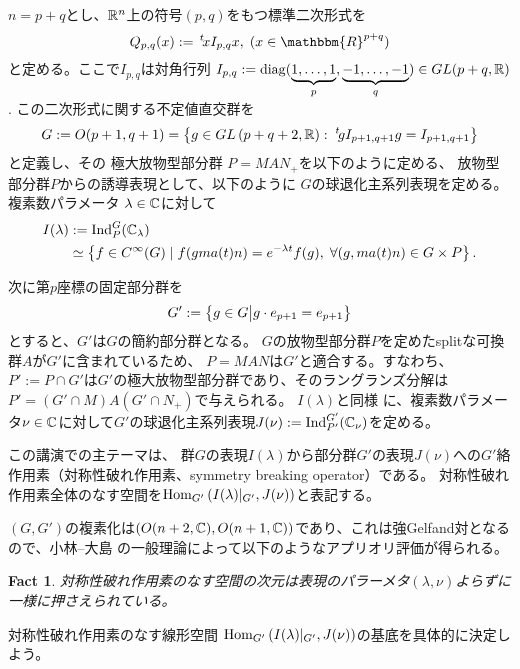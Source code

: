 \documentclass[12pt]{article} %
\newcommand{\assign}{:=}
\newcommand{\tmop}[1]{\ensuremath{\operatorname{#1}}}
\newcommand{\Hom}{\mbox{\normalfont Hom}}
\newcommand{\Ind}{\mbox{\normalfont Ind}}
\newtheorem{fact}[theorem]{Fact}
\theoremstyle{definition}
\theoremstyle{exampstyle} \newtheorem{examp}[theorem]{Theorem}
\renewcommand{\Q}{Q_{p,q}}
\newcommand{\IlambdaGprime}{I(\lambda)\kern-0.3em\mid_{G'}}
\newcommand{\SBO}{\Hom_{G'}\left(\IlambdaGprime,J(\nu) \right)}
\begin{document}
  \begin{versiona}
	  $n=p+q$と{し}、$\mathbb{R}^n$上の符号$(p,q)$をもつ標準二次形式を
	  \begin{equation*}
  \Q (x) \assign \,^t \! x I_{p, q} x, \; (x \in
  \mathbbm{R}^{p + q})
	  \end{equation*}
	  と定める。ここで$I_{p,q}$は対角行列
   $I_{p, q} \assign \tmop{diag} (\underbrace{1, \ldots, 1}_p, \underbrace{-
  1, \ldots, - 1}_q)\in GL(p+q,\R)$.
この二次形式に{関する}不定値直交群を
\begin{equation*}
	G \assign O (p +
1, q + 1)=\left\{ g\in GL\left( p+q+2,\R \right):\;^t\!gI_{p+1,q+1}g=I_{p+1,q+1} \right\}
\end{equation*}
と定義し、その
極大放物型部分群
$P=MAN_{+}$を以下のように定める、
放物型部分群$P$からの誘導表現として、以下のように
$G$の球退化主系列表現を定める。
複素数パラメータ
$\lambda\in\mathbb{C}$に対して
\begin{align*}
I(\lambda)&:=\Ind_P^G(\C_\lambda)\\
&\simeq \left\{ f\in C^{\infty}(G)\mid f(gma(t)n)=e^{-\lambda t}f(g),\;\forall(g,ma(t)n)\in G\times P \right\}.
\end{align*}

次に第$p$座標の固定部分群を
\begin{equation*}
	G':=\left\{g \in G\big| g \cdot e_{p + 1} = e_{p + 1}\right\}
\end{equation*}
とすると、$G'$は$G$の簡約部分群となる。
$G$の放物型部分群$P$を定めたsplitな可換群$A$が$G'$に含まれているため、
$P=MAN$は$G'$と適合する。すなわち、$P':=P\cap G'$は$G'$の極大放物型部分群であり、そのラングランズ分解は
$P'=(G'\cap M)A(G'\cap N_+)$で与えられ{る}。
$I(\lambda)$と同様
に、複素数パラメータ$\nu\in\mathbb{C}$に対して$G'$の球退化主系列表現$J(\nu):=\Ind_{P'}^{G'}(\C_{\nu})$を定める。

この講演での主テーマは{、}
群$G$の表現$I(\lambda)$から部分群$G'$の表現$J(\nu)$への$G'$絡作用素（対称性破れ作用素、symmetry breaking operator）である。
対称性破れ作用素全体のなす空間を$\SBO$と表記す{る}。

$(G,G')$の複素化は$(O(n+2,\mathbb{C}),O(n+1,\mathbb{C}))$であり、これは強Gelfand対となるので、小林--大島
\cite{kobayashi2013finite}の一般理論によって以下のようなアプリオリ評価が得られる。
\begin{fact}
	対称性破れ作用素のなす空間の次元は表現のパラーメタ$(\lambda,\nu)$よらずに一様に押さえられている。
\end{fact}
対称性破れ作用素のなす線形空間
$\SBO$の基底を具体的に決定しよう。


\end{versiona}
\end{document}
